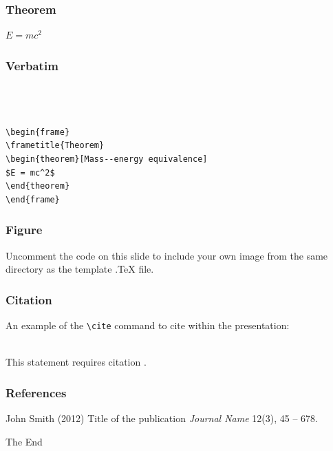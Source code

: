 \documentclass{beamer}
\begin{document}

\begin{frame}
\frametitle{Theorem}
\begin{theorem}
$E = mc^2$
\end{theorem}
\end{frame}


\begin{frame}[fragile] %
\frametitle{Verbatim}
\begin{example}
\begin{verbatim}



\begin{frame}
\frametitle{Theorem}
\begin{theorem}[Mass--energy equivalence]
$E = mc^2$
\end{theorem}
\end{frame}\end{verbatim}
\end{example}
\end{frame}


\begin{frame}
\frametitle{Figure}
Uncomment the code on this slide to include your own image from the same directory as the template .TeX file.
\end{frame}


\begin{frame}[fragile] %
\frametitle{Citation}
An example of the \verb|\cite| command to cite within the presentation:\\~

This statement requires citation \cite{p1}.
\end{frame}


\begin{frame}
\frametitle{References}
\footnotesize{
\begin{thebibliography}{99} %
 John Smith (2012)
\newblock Title of the publication
\newblock \emph{Journal Name} 12(3), 45 -- 678.
\end{thebibliography}
}
\end{frame}


\begin{frame}
\Huge{\centerline{The End}}
\end{frame}

\end{document}
